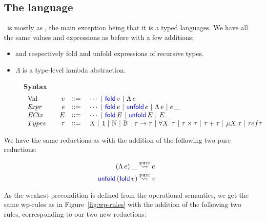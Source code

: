 \subsection{The language \texorpdfstring{\TheLang}{Fmurefconc}}
\TheLang\, is mostly as \proglang, the main exception being that it is a typed languages. We have all the same values and expressions as before with a few additions: 
\begin{itemize}
\item {} and  respectively fold and unfold expressions of recursive types.
\item $\Lambda$ is a type-level lambda abstraction.
\end{itemize}
\begin{figure}[htbp]
\textbf{Syntax}
\begin{displaymath}
  \begin{array}{lrcl}
\Val\quad
& \val & \bnfdef{}&
 \cdots
 \ALT \langkw{fold}\, \val
 \ALT \Lambda \, \expr
\\
%
\Expr \quad
& \expr & \bnfdef{} &
 \cdots
 \ALT \langkw{fold} \, \expr
 \ALT \langkw{unfold} \, \expr
 \ALT \Lambda \, \expr 
 \ALT \expr \, \_
\\
%
\ECtx\quad
& E & \bnfdef{}& 
 \cdots
 \ALT \langkw{fold} \, E
 \ALT \langkw{unfold} \, E
 \ALT E \, \_ 
 \\
%
 Types \quad & \typ & \bnfdef{}& 
 X
 \ALT 1
 \ALT \nat
 \ALT \mathbb{B}
 \ALT \typ \to \typ
 \ALT \All X. \typ
 \ALT \typ \times \typ
 \ALT \typ + \typ
 \ALT \mu X. \typ
 \ALT ref \typ
\\
%
\end{array}
\end{displaymath}
\end{figure}
We have the same reductions as \proglang{} with the addition of the following two pure reductions:

\begin{align*}
 \left( \Lambda \, e \right)\, \_ &\overset{\mathrm{pure}}{\rightsquigarrow} e \\
 \textsf{\color{blue} unfold}\, (\textsf{\color{blue} fold}\, v) &\overset{\mathrm{pure}}{\rightsquigarrow} v
\end{align*}


As the weakest precondition is defined from the operational semantics, we get the same wp-rules as in Figure~\ref{fig:wp-rules} with the addition of the following two rules, corresponding to our two new reductions:


